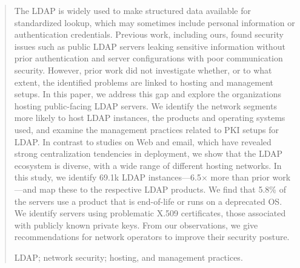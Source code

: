 \begin{abstract}
The \gls{LDAP} is widely used to make structured data available for standardized lookup, which may sometimes include personal information or authentication credentials. Previous work, including ours, found security issues such as public \gls{LDAP} servers leaking sensitive information without prior authentication and server configurations with poor communication security. However, prior work did not investigate whether, or to what extent, the identified problems are linked to hosting and management setups. In this paper, we address this gap and explore the organizations hosting public-facing \gls{LDAP} servers. We identify the network segments more likely to host \gls{LDAP} instances, the products and operating systems used, and examine the management practices related to \gls{PKI} setups for \gls{LDAP}.
In contrast to studies on Web and email, which have revealed strong centralization tendencies in deployment, we show that the \gls{LDAP} ecosystem is diverse, with a wide range of different hosting networks.
In this study, we identify 69.1k \gls{LDAP} instances---6.5$\times$ more than prior work---and map these to the respective \gls{LDAP} products. We find that 5.8\% of the servers use a product that is end-of-life or runs on a deprecated OS.
We identify servers using problematic X.509 certificates, \eg those associated with publicly known private keys.
From our observations, we give recommendations for network operators to improve their security posture.

\begin{IEEEkeywords}
LDAP; network security; hosting, and management practices.
\end{IEEEkeywords}
\end{abstract}
